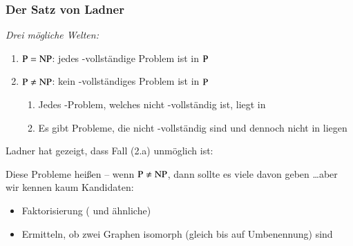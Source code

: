 \documentclass[onlymath]{beamer}
\begin{document}
\begin{frame}\frametitle{Der Satz von Ladner}

\emph{Drei mögliche Welten:}
\begin{enumerate}[(1)]
\item ${\textsc{P}}={\textsc{NP}}$: jedes -vollständige Problem ist in ${\textsc{P}}$
\item ${\textsc{P}}\neq{\textsc{NP}}$: kein -vollständiges Problem ist in ${\textsc{P}}$
\begin{enumerate}[(2.a)]
\item Jedes -Problem, welches nicht -vollständig ist, liegt in 
\item Es gibt Probleme, die nicht -vollständig sind und dennoch nicht in  liegen
\end{enumerate}
\end{enumerate}\pause\bigskip

Ladner hat gezeigt, dass Fall (2.a) unmöglich ist:


Diese Probleme heißen  \pause{} -- wenn ${\textsc{P}}\neq{\textsc{NP}}$, dann sollte es viele davon geben \ldots aber wir kennen kaum Kandidaten:
\begin{itemize}
\item Faktorisierung ( und ähnliche)
\item Ermitteln, ob zwei Graphen isomorph (gleich bis auf Umbenennung) sind
\end{itemize}


\end{frame}
\end{document}
